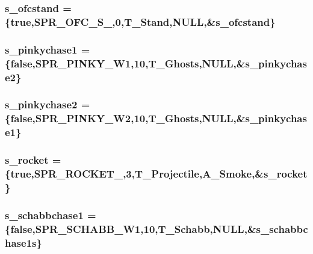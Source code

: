 \label{WL__ACT2_8C_a2b74b635952f4ea01434ed28815857ee}
\hypertarget{WL__ACT2_8C_a33164690fc87cff9f140cb3dc68dd477}{
\subsubsection[{s\_\-ofcstand}]{ {\bf s\_\-ofcstand} = \{true,SPR\_\-OFC\_\-S\_,0,T\_\-Stand,NULL,\&{\bf s\_\-ofcstand}\}}}
\label{WL__ACT2_8C_a33164690fc87cff9f140cb3dc68dd477}
\hypertarget{WL__ACT2_8C_a1c2cbdc38e60af88a3cef64207116b7a}{
\subsubsection[{s\_\-pinkychase1}]{ {\bf s\_\-pinkychase1} = \{false,SPR\_\-PINKY\_\-W1,10,T\_\-Ghosts,NULL,\&{\bf s\_\-pinkychase2}\}}}
\label{WL__ACT2_8C_a1c2cbdc38e60af88a3cef64207116b7a}
\hypertarget{WL__ACT2_8C_adac339bd7db0954ac4ba36008de72e57}{
\subsubsection[{s\_\-pinkychase2}]{ {\bf s\_\-pinkychase2} = \{false,SPR\_\-PINKY\_\-W2,10,T\_\-Ghosts,NULL,\&{\bf s\_\-pinkychase1}\}}}
\label{WL__ACT2_8C_adac339bd7db0954ac4ba36008de72e57}
\hypertarget{WL__ACT2_8C_ae7f0b57b9f3953da2e6880dc2c2f8680}{
\subsubsection[{s\_\-rocket}]{ {\bf s\_\-rocket} = \{true,SPR\_\-ROCKET\_,3,T\_\-Projectile,A\_\-Smoke,\&{\bf s\_\-rocket}\}}}
\label{WL__ACT2_8C_ae7f0b57b9f3953da2e6880dc2c2f8680}
\hypertarget{WL__ACT2_8C_aec6fd3f192ea893821d9f9707bcc714a}{
\subsubsection[{s\_\-schabbchase1}]{ {\bf s\_\-schabbchase1} = \{false,SPR\_\-SCHABB\_\-W1,10,T\_\-Schabb,NULL,\&{\bf s\_\-schabbchase1s}\}}}

